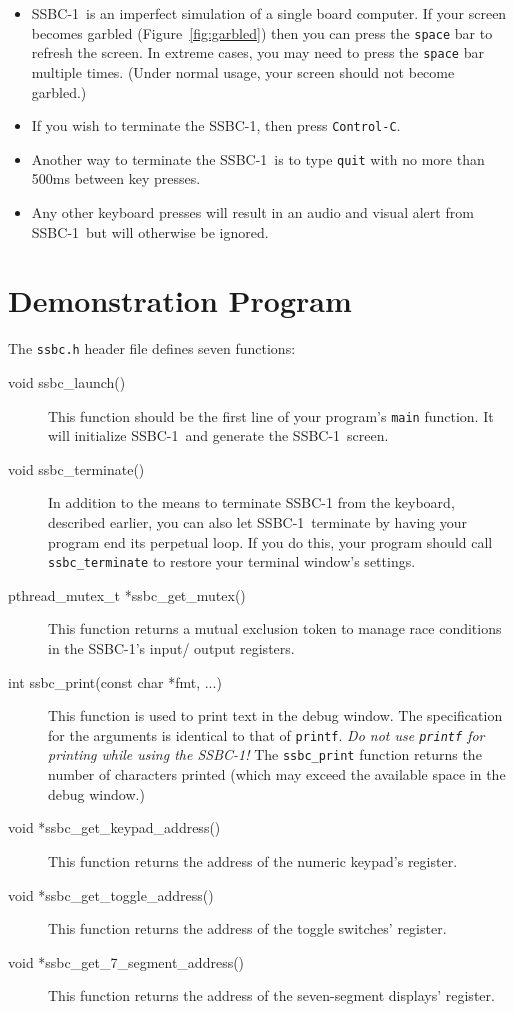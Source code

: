 \documentclass[12pt]{article}
\newcommand{\SSBC}{SSBC-1}
\begin{document}
\begin{itemize}
    \item \SSBC\ is an imperfect simulation of a single board computer. If your
        screen becomes garbled (Figure~\ref{fig:garbled}) then you can press
        the \texttt{space} bar to refresh the screen. In extreme cases, you may
        need to press the \texttt{space} bar multiple times. (Under normal
        usage, your screen should not become garbled.)
    \item If you wish to terminate the \SSBC, then press \texttt{Control-C}.
    \item Another way to terminate the \SSBC\ is to type \texttt{quit} with no
        more than 500ms between key presses.
    \item Any other keyboard presses will result in an audio and visual alert
        from \SSBC\ but will otherwise be ignored.
\end{itemize}

\newpage \section{Demonstration Program}

The \texttt{ssbc.h} header file defines seven functions:

\begin{description}
    \item [void ssbc\_launch()] This function should be the first line of your
        program's \texttt{main} function. It will initialize \SSBC\ and generate
        the \SSBC\ screen.
    \item [void ssbc\_terminate()] In addition to the means to terminate \SSBC
        from the keyboard, described earlier, you can also let \SSBC\ terminate
        by having your program end its perpetual loop. If you do this, your
        program should call \texttt{ssbc\_terminate} to restore your terminal
        window's settings.
    \item [pthread\_mutex\_t *ssbc\_get\_mutex()] This function returns a
        mutual exclusion token to manage race conditions in the \SSBC's input/
        output registers.
    \item [int ssbc\_print(const char *fmt, ...)] This function is used to
        print text in the debug window. The specification for the arguments is
        identical to that of \texttt{printf}. \textit{Do not use
        \texttt{printf} for printing while using the \SSBC!} The
        \texttt{ssbc\_print} function returns the number of characters printed
        (which may exceed the available space in the debug window.)
    \item [void *ssbc\_get\_keypad\_address()] This function returns the
        address of the numeric keypad's register.
    \item [void *ssbc\_get\_toggle\_address()] This function returns the
        address of the toggle switches' register.
    \item [void *ssbc\_get\_7\_segment\_address()] This function returns the
        address of the seven-segment displays' register.
\end{description}
\end{document}
